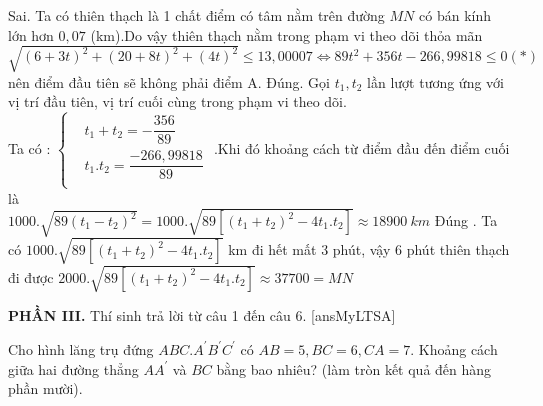 \documentclass[12pt,a4paper]{article}
\begin{document}
\begin{ex}
{\begin{itemchoice}
		\itemch Sai. Ta có thiên thạch là 1 chất điểm có tâm nằm trên đường $MN$ có bán kính lớn hơn $0,07$ (km).Do vậy thiên thạch nằm trong phạm vi theo dõi thỏa mãn\\
		$\sqrt{\left(6+3t\right)^2+\left(20+8t\right)^2+\left(4t\right)^2}\le 13,00007\Leftrightarrow 89t^2+356t-266,99818\le 0(*)$ nên điểm đầu tiên sẽ không phải điểm A.
		\itemch Đúng. Gọi $t_1,t_2$ lần lượt tương ứng với vị trí đầu tiên, vị trí cuối cùng trong phạm vi theo dõi.\\
		Ta có : $\left\{\begin{aligned}
			&{t_1}+t_2=-\dfrac{356}{89}\\ 
			&{t_1}.t_2=\dfrac{-266,99818}{89}\\ 
		\end{aligned}\right.$ .Khi đó khoảng cách từ điểm đầu đến điểm cuối là\\
		$1000.\sqrt{89\left(t_1-t_2\right)^2}=1000.\sqrt{89\left[\left(t_1+t_2\right)^2-4t_1.t_2\right]}\approx 18900~km$
		\itemch Đúng . Ta có $1000.\sqrt{89\left[\left(t_1+t_2\right)^2-4t_1.t_2\right]}$ km đi hết mất 3 phút, vậy 6 phút thiên thạch đi được $2000.\sqrt{89\left[\left(t_1+t_2\right)^2-4t_1.t_2\right]}\approx 37700=MN$
	\end{itemchoice}
}
\end{ex}

\noindent\textbf{PHẦN III.} Thí sinh trả lời từ câu 1 đến câu 6.
\setcounter{ex}{0}
[ansMyLTSA]
\begin{ex}%
Cho hình lăng trụ đứng $A B C . A^{\prime}B^{\prime}C^{\prime}$ có $A B=5, B C=6, C A=7$. Khoảng cách giữa hai đường thẳng $A A^{\prime}$ và $B C$ bằng bao nhiêu? (làm tròn kết quả đến hàng phần mười).
\end{ex}
\end{document}
